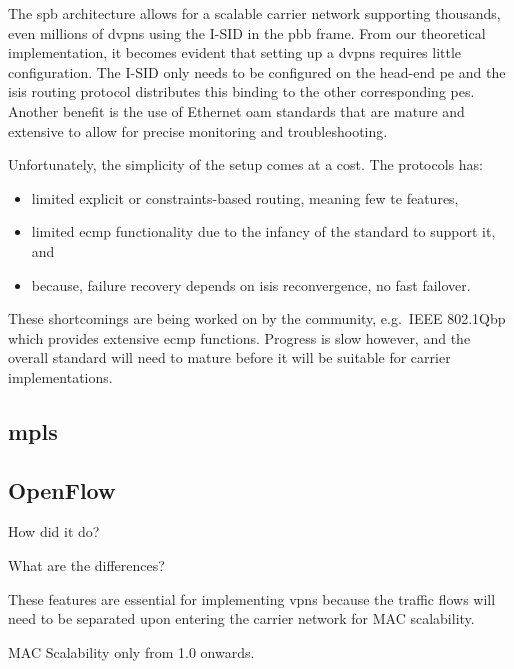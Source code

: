 The \ac{spb} architecture allows for a scalable carrier network supporting thousands, even millions of \acp{dvpn} using the I-SID in the \ac{pbb} frame. From our theoretical implementation, it becomes evident that setting up a \acp{dvpn} requires little configuration. The I-SID only needs to be configured on the head-end \ac{pe} and the \ac{isis} routing protocol distributes this binding to the other corresponding \acp{pe}. Another benefit is the use of Ethernet \ac{oam} standards that are mature and extensive to allow for precise monitoring and troubleshooting.

Unfortunately, the simplicity of the setup comes at a cost. The protocols has:
\begin{itemize}
	\item limited explicit or constraints-based routing, meaning few \ac{te} features,
	\item limited \ac{ecmp} functionality due to the infancy of the standard to support it, and
	\item because, failure recovery depends on \ac{isis} reconvergence, no fast failover.
\end{itemize}

These shortcomings are being worked on by the community, e.g.\ IEEE 802.1Qbp which provides extensive \ac{ecmp} functions. Progress is slow however, and the overall standard will need to mature before it will be suitable for carrier implementations.  


\subsection{\acs{mpls}} %
\label{sub:mpls}






\subsection{OpenFlow} %
\label{sub:openflow}

How did it do?

What are the differences?



These features are essential for implementing \acp{vpn} because the traffic flows will need to be separated upon entering the carrier network for MAC scalability.

MAC Scalability only from 1.0 onwards.

